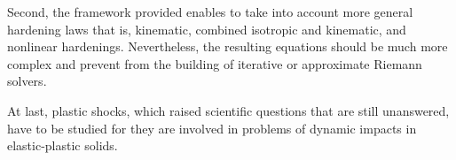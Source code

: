 Second, the framework provided enables to take into account more general hardening laws that is, kinematic, combined isotropic and kinematic, and nonlinear hardenings.
Nevertheless, the resulting equations should be much more complex and prevent from the building of iterative or approximate Riemann solvers.

At last, plastic shocks, which raised scientific questions that are still unanswered, have to be studied for they are involved in problems of dynamic impacts in elastic-plastic solids.



